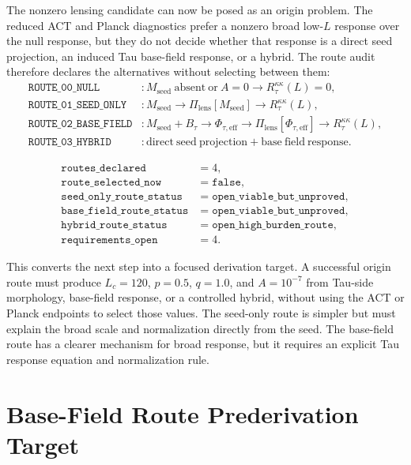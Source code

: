 \documentclass[11pt]{article}
\begin{document}
The nonzero lensing candidate can now be posed as an origin problem. The
reduced ACT and Planck diagnostics prefer a nonzero broad low-\(L\) response
over the null response, but they do not decide whether that response is a
direct seed projection, an induced Tau base-field response, or a hybrid. The
route audit therefore declares the alternatives without selecting between them:
\[
\begin{array}{ll}
\texttt{ROUTE\_00\_NULL} &: M_{\mathrm{seed}}\ \mathrm{absent}\ \mathrm{or}\ A=0
  \rightarrow R_{\tau}^{\kappa\kappa}(L)=0,\\
\texttt{ROUTE\_01\_SEED\_ONLY} &: M_{\mathrm{seed}}
  \rightarrow \Pi_{\mathrm{lens}}[M_{\mathrm{seed}}]
  \rightarrow R_{\tau}^{\kappa\kappa}(L),\\
\texttt{ROUTE\_02\_BASE\_FIELD} &: M_{\mathrm{seed}}+B_{\tau}
  \rightarrow \Phi_{\tau,\mathrm{eff}}
  \rightarrow \Pi_{\mathrm{lens}}[\Phi_{\tau,\mathrm{eff}}]
  \rightarrow R_{\tau}^{\kappa\kappa}(L),\\
\texttt{ROUTE\_03\_HYBRID} &: \mathrm{direct\ seed\ projection}
  + \mathrm{base\ field\ response}.
\end{array}
\]

\[
\begin{array}{ll}
\texttt{routes\_declared} &= 4,\\
\texttt{route\_selected\_now} &= \texttt{false},\\
\texttt{seed\_only\_route\_status} &= \texttt{open\_viable\_but\_unproved},\\
\texttt{base\_field\_route\_status} &= \texttt{open\_viable\_but\_unproved},\\
\texttt{hybrid\_route\_status} &= \texttt{open\_high\_burden\_route},\\
\texttt{requirements\_open} &= 4.
\end{array}
\]

This converts the next step into a focused derivation target. A successful
origin route must produce \(L_c=120\), \(p=0.5\), \(q=1.0\), and \(A=10^{-7}\)
from Tau-side morphology, base-field response, or a controlled hybrid, without
using the ACT or Planck endpoints to select those values. The seed-only route
is simpler but must explain the broad scale and normalization directly from the
seed. The base-field route has a clearer mechanism for broad response, but it
requires an explicit Tau response equation and normalization rule.

\section{Base-Field Route Prederivation Target}
\end{document}
